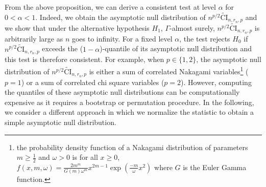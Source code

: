 From the above proposition, we can derive a consistent test at level $\alpha$ for $0<\alpha<1$. Indeed, we obtain the asymptotic null distribution of $n^{p/2}\widetilde{\text{CI}}_{n,r_n,p}$ and we show that under the alternative hypothesis $H_1$, $\Gamma$-almost surely, $n^{p/2}\widetilde{\text{CI}}_{n,r_n,p}$ is arbitrarily large as $n$ goes to infinity. For a fixed level $\alpha$, the test rejects $H_0$ if  $n^{p/2}\widetilde{\text{CI}}_{n,r_n,p}$ exceeds the ($1 - \alpha$)-quantile of its asymptotic null distribution and this test is therefore consistent. For example, when $p\in\{1,2\}$, the asymptotic null distribution of $n^{p/2}\widetilde{\text{CI}}_{n,r_n,p}$ is either a sum of correlated Nakagami variables\footnote{the probability density function of a Nakagami distribution of parameters $m\geq \frac{1}{2}$ and $\omega>0$ is  for all $ x\geq 0$,\\ $f(x,m,\omega)=\frac{2m^m }{G(m)\omega^m}x^{2m-1}\exp(\frac{-m}{\omega}x^2)$ where $G$ is the Euler Gamma function.} ($p=1$) or a sum of correlated chi square variables ($p=2$). 
However, computing the quantiles of these asymptotic null distributions can be computationally expensive as it requires a bootstrap or permutation procedure. In the following, we consider a different approach in which we normalize the statistic to obtain a simple asymptotic null distribution.

